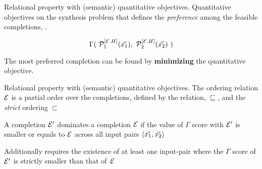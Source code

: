 \begin{frame}{Relational property with (semantic) quantitative objectives.}
    Quantitative objectives on the synthesis problem that defines the \textit{preference} among the feasible completions, \E.
    \pause
    \vspace{20pt}
    \begin{tcolorbox}[
    colback=white,
    colframe=green,
    colbacktitle=white!70!green,
    coltitle=black,
    title=\textbf{Quantitative Objective, $\Gamma$},
    enhanced,
    attach boxed title to top left={yshift=-2mm, xshift=0.5cm},%
]
    \[
        \Gamma(\ \proghole{1}{\E.H}(\vec{x_1}),\ \proghole{2}{\E.H}(\vec{x_2})\ )
    \]
\end{tcolorbox}
\pause
\vspace{10pt}
The most preferred completion can be found by \textbf{minimizing} the quantitative objective.
\end{frame}

\begin{frame}{Relational property with (semantic) quantitative objectives.}
    The ordering relation $\mathcal{E}$ is a partial order over the completions, defined by the relation, $\sqsubseteq$, and the \textit{strict} ordering $\sqsubset$
    \pause
    \vspace{10pt}
        \begin{tcolorbox}[
        colback=white,
        colframe=green,
        colbacktitle=white!70!green,
        coltitle=black,
        title=\textbf{Dominance},
        enhanced,
        attach boxed title to top left={yshift=-2mm, xshift=0.5cm},%
        ]
A completion $\mathcal{E}'$ dominates a completion $\mathcal{E}$ if the value of $\Gamma$ score with $\mathcal{E}'$ is smaller or equals to $\mathcal{E}$ across all input pairs $\langle \vec{x_1}, \vec{x_2} \rangle$
    \end{tcolorbox}
        \pause
    \vspace{10pt}
    \begin{tcolorbox}[
        colback=white,
        colframe=red,
        colbacktitle=white!70!red,
        coltitle=black,
        title=\textbf{Strict Dominance},
        enhanced,
        attach boxed title to top left={yshift=-2mm, xshift=0.5cm},%
        ]
Additionally requires the existence of at least one input-pair where the $\Gamma$ score of $\mathcal{E}'$ is strictly smaller than that of~$\mathcal{E}$
    \end{tcolorbox}
\end{frame}

